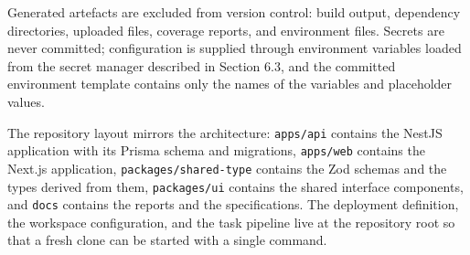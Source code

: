 Generated artefacts are excluded from version control: build output, dependency directories, uploaded files, coverage reports, and environment files. Secrets are never committed; configuration is supplied through environment variables loaded from the secret manager described in Section 6.3, and the committed environment template contains only the names of the variables and placeholder values.

The repository layout mirrors the architecture: \texttt{apps/api} contains the NestJS application with its Prisma schema and migrations, \texttt{apps/web} contains the Next.js application, \texttt{packages/shared-type} contains the Zod schemas and the types derived from them, \texttt{packages/ui} contains the shared interface components, and \texttt{docs} contains the reports and the specifications. The deployment definition, the workspace configuration, and the task pipeline live at the repository root so that a fresh clone can be started with a single command.
